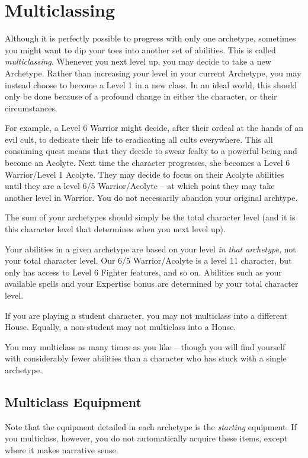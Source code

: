 \section{Multiclassing}\label{S:Multiclassing}
Although it is perfectly possible to progress with only one archetype, sometimes you might want to dip your toes into another set of abilities. This is called {\it multiclassing}. Whenever you next level up, you may decide to take a new Archetype. Rather than increasing your level in your current Archetype, you may instead choose to become a Level 1 in a new class. In an ideal world, this should only be done because of a profound change in either the character, or their circumstances. 

For example, a Level 6 Warrior might decide, after their ordeal at the hands of an evil cult, to dedicate their life to eradicating all cults everywhere. This all consuming quest means that they decide to swear fealty to a powerful being and become an Acolyte. Next time the character progresses, she becomes a Level 6 Warrior/Level 1 Acolyte. They may decide to focus on their Acolyte abilities until they are a level 6/5 Warrior/Acolyte -- at which point they may take another level in Warrior. You do not necessarily abandon your original archtype. 

The sum of your archetypes should simply be the total character level (and it is this character level that determines when you next level up). 

Your abilities in a given archetype are based on your level {\it in that archetype}, not your total character level. Our 6/5 Warrior/Acolyte is a level 11 character, but only has access to Level 6 Fighter features, and so on. Abilities such as your available spells and your Expertise bonus are determined by your total character level. 

If you are playing a student character, you may not multiclass into a different House. Equally, a non-student may not multiclass into a House. 

You may multiclass as many times as you like -- though you will find yourself with considerably fewer abilities than a character who has stuck with a single archetype.


\subsection*{Multiclass Equipment}

Note that the equipment detailed in each archetype is the {\it starting} equipment. If you multiclass, however, you do not automatically acquire these items, except where it makes narrative sense. 

